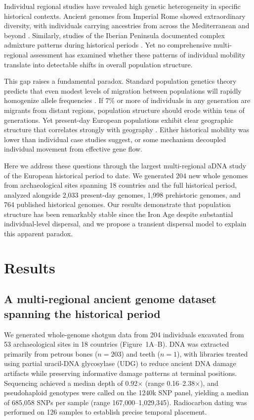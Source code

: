 \documentclass[11pt]{article}
\begin{document}
Individual regional studies have revealed high genetic heterogeneity in specific historical contexts. Ancient genomes from Imperial Rome showed extraordinary diversity, with individuals carrying ancestries from across the Mediterranean and beyond \citep{antonio2019ancient}. Similarly, studies of the Iberian Peninsula documented complex admixture patterns during historical periods \citep{olalde2019genomic}. Yet no comprehensive multi-regional assessment has examined whether these patterns of individual mobility translate into detectable shifts in overall population structure.

This gap raises a fundamental paradox. Standard population genetics theory predicts that even modest levels of migration between populations will rapidly homogenize allele frequencies \citep{wright1931evolution,slatkin1987gene}. If 7\% or more of individuals in any generation are migrants from distant regions, population structure should erode within tens of generations. Yet present-day European populations exhibit clear geographic structure that correlates strongly with geography \citep{novembre2008genes,lao2008correlation}. Either historical mobility was lower than individual case studies suggest, or some mechanism decoupled individual movement from effective gene flow.

Here we address these questions through the largest multi-regional aDNA study of the European historical period to date. We generated 204 new whole genomes from archaeological sites spanning 18 countries and the full historical period, analyzed alongside 2,033 present-day genomes, 1,998 prehistoric genomes, and 764 published historical genomes. Our results demonstrate that population structure has been remarkably stable since the Iron Age despite substantial individual-level dispersal, and we propose a transient dispersal model to explain this apparent paradox.

\section{Results}

\subsection{A multi-regional ancient genome dataset spanning the historical period}

We generated whole-genome shotgun data from 204 individuals excavated from 53 archaeological sites in 18 countries (Figure~1A--B). DNA was extracted primarily from petrous bones ($n = 203$) and teeth ($n = 1$), with libraries treated using partial uracil-DNA glycosylase (UDG) to reduce ancient DNA damage artifacts while preserving informative damage patterns at terminal positions. Sequencing achieved a median depth of 0.92$\times$ (range 0.16--2.38$\times$), and pseudohaploid genotypes were called on the 1240k SNP panel, yielding a median of 685,058 SNPs per sample (range 167,000--1,029,345). Radiocarbon dating was performed on 126 samples to establish precise temporal placement.
\end{document}
